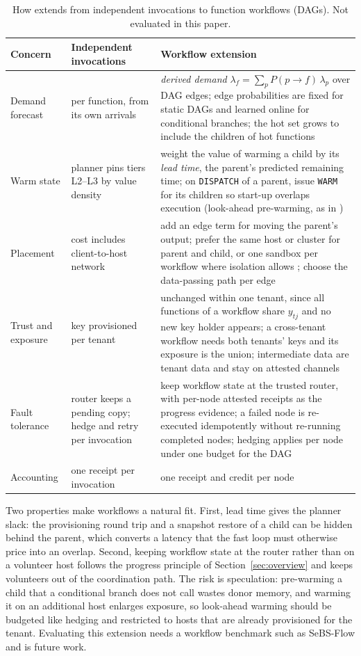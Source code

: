 \begin{table}[t]
\caption{How \voss{} extends from independent invocations to function workflows (DAGs). Not evaluated in this paper.}
\label{tab:dag}
\centering\scriptsize
\setlength{\tabcolsep}{3pt}
\begin{tabular}{@{}p{1.35cm}p{2.7cm}p{4.1cm}@{}}
\toprule
Concern & Independent invocations & Workflow extension \\
\midrule
Demand forecast & per function, from its own arrivals & \emph{derived demand} $\lambda_f=\sum_p P(p\!\to\!f)\,\lambda_p$ over DAG edges; edge probabilities are fixed for static DAGs and learned online for conditional branches; the hot set grows to include the children of hot functions \\
Warm state & planner pins tiers L2--L3 by value density & weight the value of warming a child by its \emph{lead time}, the parent's predicted remaining time; on \texttt{DISPATCH} of a parent, issue \texttt{WARM} for its children so start-up overlaps execution (look-ahead pre-warming, as in \cite{daw2020xanadu,mahgoub2022orion}) \\
Placement & cost includes client-to-host network & add an edge term for moving the parent's output; prefer the same host or cluster for parent and child, or one sandbox per workflow where isolation allows \cite{akkus2018sand,kotni2021faastlane}; choose the data-passing path per edge \cite{mahgoub2021sonic} \\
Trust and exposure & key provisioned per tenant & unchanged within one tenant, since all functions of a workflow share $y_{tj}$ and no new key holder appears; a cross-tenant workflow needs both tenants' keys and its exposure is the union; intermediate data are tenant data and stay on attested channels \\
Fault tolerance & router keeps a pending copy; hedge and retry per invocation & keep workflow state at the trusted router, with per-node attested receipts as the progress evidence; a failed node is re-executed idempotently without re-running completed nodes; hedging applies per node under one budget for the DAG \\
Accounting & one receipt per invocation & one receipt and credit per node \\
\bottomrule
\end{tabular}
\end{table}

Two properties make workflows a natural fit. First, lead time gives the planner slack: the provisioning round trip and a snapshot restore of a child can be hidden behind
the parent, which converts a latency that the fast loop must otherwise price into an overlap. Second, keeping workflow state at the router rather than on a volunteer host
follows the progress principle of Section~\ref{sec:overview} and keeps volunteers out of the coordination path. The risk is speculation: pre-warming a child that a conditional
branch does not call wastes donor memory, and warming it on an additional host enlarges exposure, so look-ahead warming should be budgeted like hedging and restricted to
hosts that are already provisioned for the tenant. Evaluating this extension needs a workflow benchmark such as SeBS-Flow \cite{copik2024sebsflow} and is future work.

